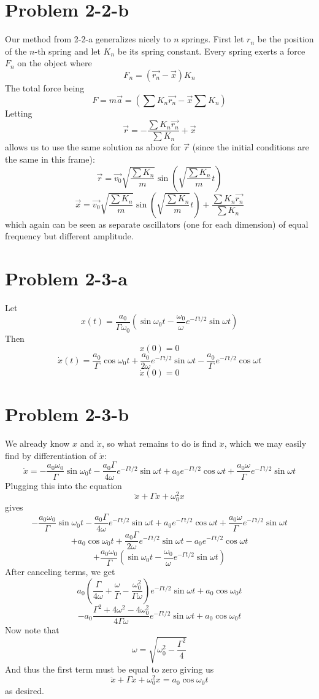 \section*{Problem 2-2-b}
Our method from 2-2-a generalizes nicely to $n$ springs. First let $r_n$ be the position of the $n$-th spring and let $K_n$ be its spring constant. Every spring exerts a force $F_n$ on the object where
\[ F_n = (\vec{r_n} - \vec{x})K_n \]
The total force being
\[ F = m\vec{a} = (\sum K_n\vec{r_n} - \vec{x}\sum K_n) \]
Letting 
\[ \vec{r} = -\dfrac{\sum K_n\vec{r_n}}{\sum K_n} + \vec{x} \]
allows us to use the same solution as above for $\vec{r}$ (since the initial conditions are the same in this frame):
\[ \vec{r} = \vec{v_0}\sqrt{\frac{\sum K_n}{m}}\sin\left(\sqrt{\frac{\sum K_n}{m}}t\right) \]
\[ \vec{x} = \vec{v_0}\sqrt{\frac{\sum K_n}{m}}\sin\left(\sqrt{\frac{\sum K_n}{m}}t\right) + \dfrac{\sum K_n\vec{r_n}}{\sum K_n}  \]
which again can be seen as separate oscillators (one for each dimension) of equal frequency but different amplitude.
\section*{Problem 2-3-a}
Let 
\[ x(t)=\dfrac{a_0}{\Gamma \omega_0}\left(\sin \omega_0 t -\frac{\omega_0}{\omega}e^{-\Gamma t/2}\sin \omega t\right) \]
Then 
\[ x(0) = 0 \]
\[ \dot{x}(t) = \frac{a_0}{\Gamma}\cos\omega_0 t + \frac{a_0}{2\omega} e^{-\Gamma t/2}\sin \omega t - \frac{a_0}{\Gamma}e^{-\Gamma t/2}\cos \omega t \]
\[ \dot{x}(0) =0\]
\section*{Problem 2-3-b}
We already know $x$ and $\dot{x}$, so what remains to do is find $\ddot{x}$, which we may easily find by differentiation of $\dot{x}$:
\[ \ddot{x} = -\frac{a_0\omega_0}{\Gamma}\sin \omega_0 t - \frac{a_0\Gamma}{4\omega}e^{-\Gamma t/2}\sin \omega t + a_0 e^{-\Gamma t/2}\cos \omega t + \frac{a_0\omega}{\Gamma} e^{-\Gamma t/2} \sin \omega t \]
Plugging this into the equation
\[ \ddot{x} + \Gamma\dot{x} + \omega_0^2 x \]
gives 
\[ -\frac{a_0\omega_0}{\Gamma}\sin \omega_0 t - \frac{a_0\Gamma}{4\omega}e^{-\Gamma t/2}\sin \omega t + a_0 e^{-\Gamma t/2}\cos \omega t + \frac{a_0\omega}{\Gamma} e^{-\Gamma t/2} \sin \omega t \]
\[ + a_0\cos\omega_0 t + \frac{a_0\Gamma}{2\omega} e^{-\Gamma t/2}\sin \omega t -  a_0e^{-\Gamma t/2}\cos \omega t \]
\[ + \dfrac{a_0\omega_0}{\Gamma}\left(\sin \omega_0 t -\frac{\omega_0}{\omega}e^{-\Gamma t/2}\sin \omega t\right) \] 
After canceling terms, we get
\[ a_0\left(\frac{\Gamma}{4\omega} + \frac{\omega}{\Gamma} - \frac{\omega_0^2}{\Gamma\omega}\right) e^{-\Gamma t/2}\sin \omega t + a_0 \cos \omega_0 t \]
\[ -a_0\dfrac{\Gamma^2+4\omega^2-4\omega_0^2}{4\Gamma\omega} e^{-\Gamma t/2}\sin \omega t + a_0 \cos \omega_0 t \]
Now note that 
\[ \omega = \sqrt{\omega_0^2-\frac{\Gamma^2}{4}} \]
And thus the first term must be equal to zero giving us
\[ \ddot{x} + \Gamma\dot{x} + \omega_0^2 x = a_0 \cos \omega_0 t \] 
as desired. 
